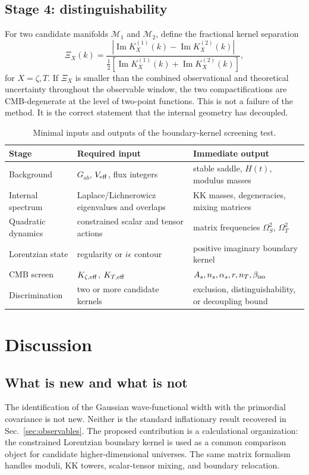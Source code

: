 \documentclass[aps,prd,twocolumn,superscriptaddress,nofootinbib,longbibliography]{revtex4-2}
\newcommand{\cM}{\mathcal M}
\begin{document}
\subsection{Stage 4: distinguishability}
For two candidate manifolds $\cM_1$ and $\cM_2$, define the fractional kernel separation
\begin{equation}
\Xi_X(k)=\frac{\left|\operatorname{Im}K_X^{(1)}(k)-
\operatorname{Im}K_X^{(2)}(k)\right|}
{\frac12\left[\operatorname{Im}K_X^{(1)}(k)+
\operatorname{Im}K_X^{(2)}(k)\right]},
\end{equation}
for $X=\zeta,T$. If $\Xi_X$ is smaller than the combined observational and theoretical uncertainty throughout the observable window, the two compactifications are CMB-degenerate at the level of two-point functions. This is not a failure of the method. It is the correct statement that the internal geometry has decoupled.

\begin{table}[t]
\caption{Minimal inputs and outputs of the boundary-kernel screening test.}
\begin{ruledtabular}
\begin{tabular}{lll}
Stage & Required input & Immediate output\\
\hline
Background & $G_{ab}$, $V_{\rm eff}$, flux integers & stable saddle, $H(t)$, modulus masses\\
Internal spectrum & Laplace/Lichnerowicz eigenvalues and overlaps & KK masses, degeneracies, mixing matrices\\
Quadratic dynamics & constrained scalar and tensor actions & matrix frequencies $\Omega_S^2$, $\Omega_T^2$\\
Lorentzian state & regularity or $i\epsilon$ contour & positive imaginary boundary kernel\\
CMB screen & $K_{\zeta,\rm eff}$, $K_{T,\rm eff}$ & $A_s,n_s,\alpha_s,r,n_T,\beta_{\rm iso}$\\
Discrimination & two or more candidate kernels & exclusion, distinguishability, or decoupling bound\\
\end{tabular}
\end{ruledtabular}
\end{table}

\section{Discussion}
\label{sec:discussion}

\subsection{What is new and what is not}
The identification of the Gaussian wave-functional width with the primordial covariance is not new. Neither is the standard inflationary result recovered in Sec.~\ref{sec:observables}. The proposed contribution is a calculational organization: the constrained Lorentzian boundary kernel is used as a common comparison object for candidate higher-dimensional universes. The same matrix formalism handles moduli, KK towers, scalar-tensor mixing, and boundary relocation.
\end{document}

